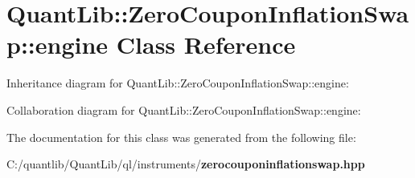 \section{Quant\+Lib\+:\+:Zero\+Coupon\+Inflation\+Swap\+:\+:engine Class Reference}
\label{class_quant_lib_1_1_zero_coupon_inflation_swap_1_1engine}


Inheritance diagram for Quant\+Lib\+:\+:Zero\+Coupon\+Inflation\+Swap\+:\+:engine\+:


Collaboration diagram for Quant\+Lib\+:\+:Zero\+Coupon\+Inflation\+Swap\+:\+:engine\+:


The documentation for this class was generated from the following file\+:\begin{DoxyCompactItemize}
\item 
C\+:/quantlib/\+Quant\+Lib/ql/instruments/{\bf zerocouponinflationswap.\+hpp}\end{DoxyCompactItemize}

